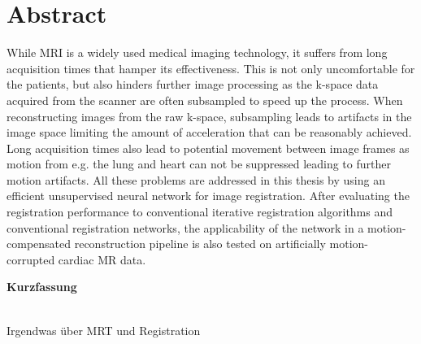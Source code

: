 \chapter*{Abstract}
While MRI is a widely used medical imaging technology, it suffers from long acquisition times that hamper its effectiveness. This is not only uncomfortable for the patients, but also hinders further image processing as the k-space data acquired from the scanner are often subsampled to speed up the process. When reconstructing images from the raw k-space, subsampling leads to artifacts in the image space limiting the amount of acceleration that can be reasonably achieved. Long acquisition times also lead to potential movement between image frames as motion from e.g. the lung and heart can not be suppressed leading to further motion artifacts. All these problems are addressed in this thesis by using an efficient unsupervised neural network for image registration. After evaluating the registration performance to conventional iterative registration algorithms and conventional registration networks, the applicability of the network in a motion-compensated reconstruction pipeline is also tested on artificially motion-corrupted cardiac MR data.

\vspace*{1.5cm}
\begin{Huge}
\noindent \textbf{Kurzfassung}
\end{Huge}
\chapterheadstartvskip \\
Irgendwas über MRT und Registration
